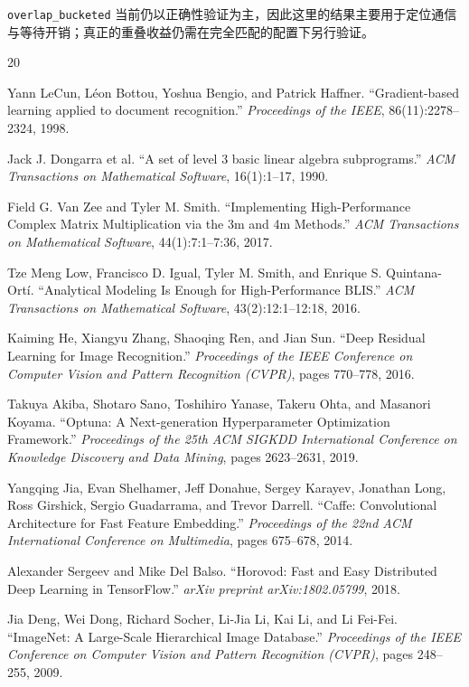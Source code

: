 \documentclass[a4paper,11pt,oneside]{article}
\begin{document}
\texttt{overlap\_bucketed} 当前仍以正确性验证为主，因此这里的结果主要用于定位通信与等待开销；真正的重叠收益仍需在完全匹配的配置下另行验证。

\begin{thebibliography}{20}

Yann LeCun, Léon Bottou, Yoshua Bengio, and Patrick Haffner.
``Gradient-based learning applied to document recognition.''
\textit{Proceedings of the IEEE}, 86(11):2278--2324, 1998.

Jack J. Dongarra et al.
``A set of level 3 basic linear algebra subprograms.''
\textit{ACM Transactions on Mathematical Software}, 16(1):1--17, 1990.

Field G. Van Zee and Tyler M. Smith.
``Implementing High-Performance Complex Matrix Multiplication via the 3m and 4m Methods.''
\textit{ACM Transactions on Mathematical Software}, 44(1):7:1--7:36, 2017.

Tze Meng Low, Francisco D. Igual, Tyler M. Smith, and Enrique S. Quintana-Ort{\'i}.
``Analytical Modeling Is Enough for High-Performance BLIS.''
\textit{ACM Transactions on Mathematical Software}, 43(2):12:1--12:18, 2016.

Kaiming He, Xiangyu Zhang, Shaoqing Ren, and Jian Sun.
``Deep Residual Learning for Image Recognition.''
\textit{Proceedings of the IEEE Conference on Computer Vision and Pattern Recognition (CVPR)}, pages 770--778, 2016.

Takuya Akiba, Shotaro Sano, Toshihiro Yanase, Takeru Ohta, and Masanori Koyama.
``Optuna: A Next-generation Hyperparameter Optimization Framework.''
\textit{Proceedings of the 25th ACM SIGKDD International Conference on Knowledge Discovery and Data Mining}, pages 2623--2631, 2019.

Yangqing Jia, Evan Shelhamer, Jeff Donahue, Sergey Karayev, Jonathan Long, Ross Girshick, Sergio Guadarrama, and Trevor Darrell.
``Caffe: Convolutional Architecture for Fast Feature Embedding.''
\textit{Proceedings of the 22nd ACM International Conference on Multimedia}, pages 675--678, 2014.

Alexander Sergeev and Mike Del Balso.
``Horovod: Fast and Easy Distributed Deep Learning in TensorFlow.''
\textit{arXiv preprint arXiv:1802.05799}, 2018.

Jia Deng, Wei Dong, Richard Socher, Li-Jia Li, Kai Li, and Li Fei-Fei.
``ImageNet: A Large-Scale Hierarchical Image Database.''
\textit{Proceedings of the IEEE Conference on Computer Vision and Pattern Recognition (CVPR)}, pages 248--255, 2009.


\end{thebibliography}
\end{document}
